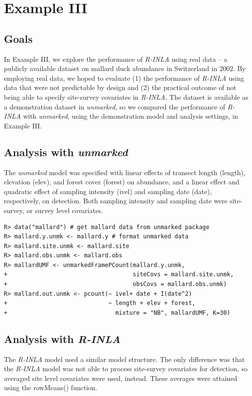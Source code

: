 \documentclass{article}
\begin{document}
\section[Example III]{Example III}
\subsection[Goals]{Goals}
In Example III, we explore the performance of \emph{R-INLA} using real data -- a publicly available dataset on mallard duck abundance in Switzerland in 2002. By employing real data, we hoped to evaluate (1) the performance of \emph{R-INLA} using data that were not predictable by design and (2) the practical outcome of not being able to specify site-survey covariates in \emph{R-INLA}. The dataset is available as a demonstration dataset in \emph{unmarked}, so we compared the performance of \emph{R-INLA} with \emph{unmarked}, using the demonstration model and analysis settings, in Example III.

\subsection[Analysis with unmarked]{Analysis with \emph{unmarked}}
The \emph{unmarked} model was specified with linear effects of transect length (length), elevation (elev), and forest cover (forest) on abundance, and a linear effect and quadratic effect of sampling intensity (ivel) and sampling date (date), respectively, on detection. Both sampling intensity and sampling date were site-survey, or survey level covariates.

\begin{verbatim}
R> data("mallard") # get mallard data from unmarked package
R> mallard.y.unmk <- mallard.y # format unmarked data
R> mallard.site.unmk <- mallard.site
R> mallard.obs.unmk <- mallard.obs
R> mallardUMF <- unmarkedFramePCount(mallard.y.unmk, 
+                                    siteCovs = mallard.site.unmk,
+                                    obsCovs = mallard.obs.unmk)
R> mallard.out.unmk <- pcount(~ ivel+ date + I(date^2)
+                             ~ length + elev + forest,
+                               mixture = "NB", mallardUMF, K=30) 
\end{verbatim}

\subsection[Analysis with R-INLA]{Analysis with \emph{R-INLA}}
The \emph{R-INLA} model used a similar model structure. The only difference was that the \emph{R-INLA} model was not able to process site-survey covariates for detection, so averaged site level covariates were used, instead. These averages were attained using the rowMeans() function.
\end{document}
